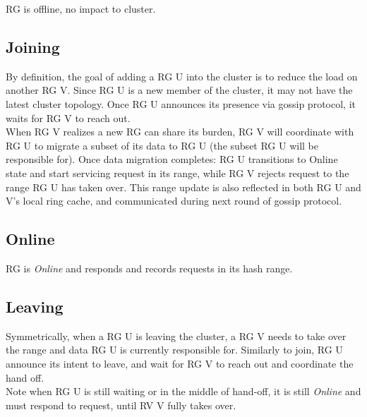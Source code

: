RG is offline, no impact to cluster.

\subsection{Joining}

By definition, the goal of adding a RG U into the cluster is to reduce the load
on another RG V. Since RG U is a new member of the cluster, it may not have the
latest cluster topology. Once RG U announces its presence via gossip protocol,
it waits for RG V to reach out.\\

When RG V realizes a new RG can share its burden, RG V will coordinate with RG U
to migrate a subset of its data to RG U (the subset RG U will be responsible
for). Once data migration completes: RG U transitions to Online state and start
servicing request in its range, while RG V rejects request to the range RG U has
taken over. This range update is also reflected in both RG U and V's local ring
cache, and communicated during next round of gossip protocol.

\subsection{Online}

RG is \textit{Online} and responds and records requests in its hash range. 

\subsection{Leaving}

Symmetrically, when a RG U is leaving the cluster, a RG V needs to take over the
range and data RG U is currently responsible for. Similarly to join, RG U 
announce its intent to leave, and wait for RG V to reach out and coordinate the
hand off.\\

Note when RG U is still waiting or in the middle of hand-off, it is still
\textit{Online} and must respond to request, until RV V fully takes over.





